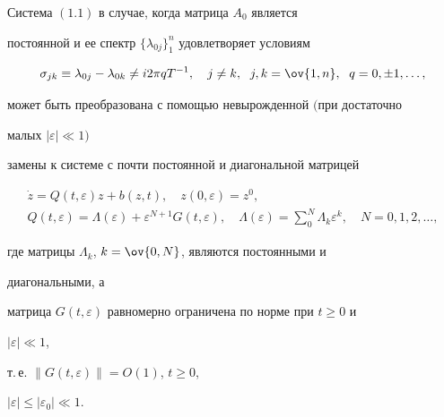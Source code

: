 \begin{thms} 


Система $(1.1)$ в случае, когда матрица $A_0$ является  


постоянной и ее спектр $\{\lambda_{0j}\}^n_1$ удовлетворяет условиям 


\begin{equation} 


\sigma_{j k}\equiv\lambda_{0j}-\lambda_{0k}\ne i2\pi q T^{-1}, 


\quad j\ne k,\ \; j,k=\ov{1,n},\ \; q=0,\pm1,\dotsc, 


\end{equation} 


может быть преобразована с помощью невырожденной $($при достаточно  


малых $|\varepsilon|\ll 1)$


замены к системе с почти постоянной и диагональной матрицей 


\begin{equation} 


\begin{array}{c} 


\Dot z=Q(t,\varepsilon)z+b(z,t),\quad z(0,\varepsilon)=z^0,\\[3mm] 


Q(t,\varepsilon)=\Lambda(\varepsilon)+\varepsilon^{N+1} 


G(t,\varepsilon),\quad 


\Lambda(\varepsilon)=\displaystyle\sum^N_0 


\Lambda_k\varepsilon^k,\quad N=0,1,2,\dotsc, 


\end{array} 


\end{equation} 


где матрицы $\Lambda_k$, $k=\ov{0,N}$, являются постоянными и 


диагональными, а  


матрица $G(t,\varepsilon)$ равномерно ограничена по норме при $t\ge0$ и 


$|\varepsilon|\ll1$, 


т.\,е. $\|G(t,\varepsilon)\|=O(1)$, $t\ge0$, 


$|\varepsilon|\le|\varepsilon_0|\ll1$. 


\end{thms} 


 



